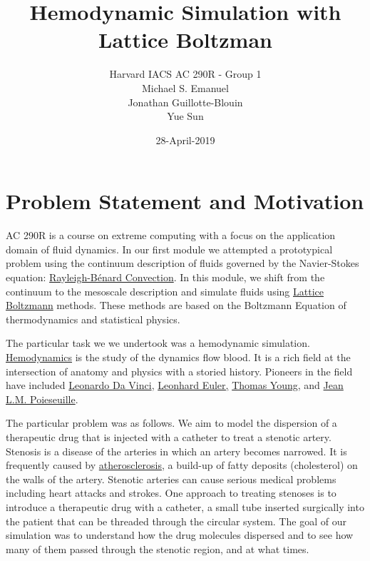 \documentclass[11pt]{article} %
\title{Hemodynamic Simulation with Lattice Boltzman}
\author{Harvard IACS AC 290R - Group 1 \\
Michael S. Emanuel \\
Jonathan Guillotte-Blouin \\
Yue Sun \\
}
\date{28-April-2019}
\begin{document}
\maketitle

\section{Problem Statement and Motivation}
AC 290R is a course on extreme computing with a focus on the application domain of fluid dynamics.
In our first module we attempted a prototypical problem using the continuum description of fluids
governed by the Navier-Stokes equation: 
\href{https://en.wikipedia.org/wiki/Rayleigh%E2%80%93B%C3%A9nard_convection}{Rayleigh-B\'enard Convection}.
In this module, we shift from the continuum to the mesoscale description and simulate fluids using  
\href{https://en.wikipedia.org/wiki/Lattice_Boltzmann_methods}{Lattice Boltzmann} methods.  
These methods are based on the Boltzmann Equation of thermodynamics and statistical physics.

The particular task we we undertook was a hemodynamic simulation.
\href{https://en.wikipedia.org/wiki/Hemodynamics}{Hemodynamics} is the study of the dynamics flow blood.  
It is a rich field at the intersection of anatomy and physics with a storied history.
Pioneers in the field have included 
\href{https://en.wikipedia.org/wiki/Leonardo_da_Vinci}{Leonardo Da Vinci}, 
\href{https://en.wikipedia.org/wiki/Leonhard_Euler}{Leonhard Euler,} 
\href{https://en.wikipedia.org/wiki/Thomas_Young_(scientist)}{Thomas Young}, and 
\href{https://en.wikipedia.org/wiki/Jean_L%C3%A9onard_Marie_Poiseuille}{Jean L.M. Poieseuille}.

The particular problem was as follows.  
We aim to model the dispersion of a therapeutic drug that is injected with a catheter to treat a stenotic artery.
Stenosis is a disease of the arteries in which an artery becomes narrowed.
It is frequently caused by 
\href{https://en.wikipedia.org/wiki/Atherosclerosis}{atherosclerosis}, 
a build-up of fatty deposits (cholesterol) on the walls of the artery.
Stenotic arteries can cause serious medical problems including heart attacks and strokes.
One approach to treating stenoses is to introduce a therapeutic drug with a catheter,
a small tube inserted surgically into the patient that can be threaded through the circular system.
The goal of our simulation was to understand how the drug molecules dispersed 
and to see how many of them passed through the stenotic region, and at what times.
\end{document}
